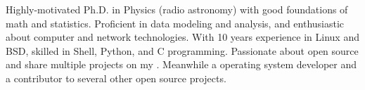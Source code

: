 \documentclass{resume}
\begin{document}
\makeheader

Highly-motivated Ph.D. in Physics (radio astronomy)
with good foundations of math and statistics.
Proficient in data modeling and analysis,
and enthusiastic about computer and network technologies.
With 10 years experience in Linux and BSD,
skilled in Shell, Python, and C programming.
Passionate about open source and share multiple projects on my
.
Meanwhile a 
operating system developer and a contributor to several other
open source projects.

\begin{competences}[10em]
\end{competences}


\end{document}
